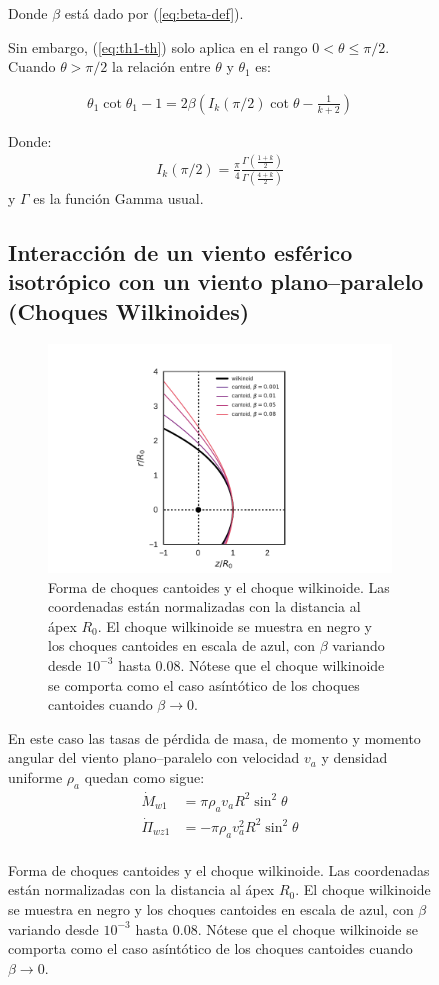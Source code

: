 \begin{figure}
Donde $\beta$ está dado por (\ref{eq:beta-def}).

Sin embargo, (\ref{eq:th1-th}) solo aplica en el rango $0 < \theta \leq \pi/2$. Cuando $\theta > \pi/2$ la relación entre $\theta$ y $\theta_1$ es:

\begin{align}
  \theta_1\cot\theta_1 - 1 = 2\beta\left(I_k(\pi/2)\cot\theta - \frac{1}{k+2}\right) \label{eq:th1-th-far-wings}
\end{align}

Donde:
\begin{align}
I_k(\pi/2) = \frac{\pi}{4}\frac{\Gamma\left(\frac{1+k}{2}\right)}{\Gamma\left(\frac{4+k}{2}\right)} 
\end{align}
y $\Gamma$ es la función Gamma usual.

\subsection{Interacción de un viento esférico isotrópico con un viento plano--paralelo (Choques Wilkinoides)}
\label{sec:wilkinoids}
\begin{figure}
  \centering
  \includegraphics[width=0.6\linewidth]{./Figures/cantoid-wilkinoid-shape}
  \caption{Forma de choques cantoides y el choque wilkinoide. Las coordenadas están normalizadas con la distancia al ápex $R_0$. El choque wilkinoide se muestra en negro y los choques cantoides en escala de azul, con $\beta$ variando desde $10^{-3}$ hasta 0.08. Nótese que el choque wilkinoide se comporta como el caso asíntótico de los choques cantoides cuando $\beta\to 0$.}
\end{figure}
En este caso las tasas de pérdida de masa, de momento y momento angular del viento plano--paralelo con velocidad $v_a$ y densidad uniforme $\rho_a$ quedan como sigue:
\begin{align}
  \dot{M}_{w1} &= \pi \rho_a v_a R^2 \sin^2\theta \label{eq:w-dotm}\\
  \dot{\Pi}_{wz1} &= - \pi\rho_a v^2_a R^2 \sin^2\theta\\

\end{align}
\end{figure}
